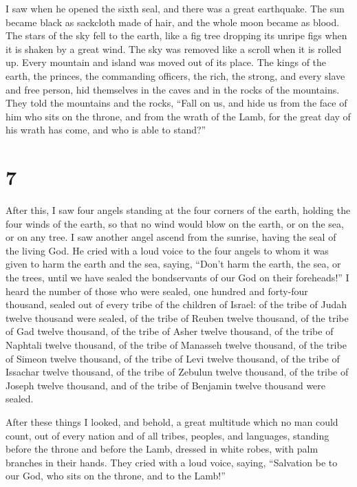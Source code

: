  I saw when he opened the sixth seal, and there was a great
earthquake. The sun became black as sackcloth made of hair, and the
whole moon became as blood.  The stars of the sky fell to
the earth, like a fig tree dropping its unripe figs when it is shaken by
a great wind.  The sky was removed like a scroll when it is
rolled up. Every mountain and island was moved out of its place.
 The kings of the earth, the princes, the commanding
officers, the rich, the strong, and every slave and free person, hid
themselves in the caves and in the rocks of the mountains. 
They told the mountains and the rocks, ``Fall on us, and hide us from
the face of him who sits on the throne, and from the wrath of the Lamb,
 for the great day of his wrath has come, and who is able
to stand?''

\hypertarget{section-6}{%
\section{7}\label{section-6}}

 After this, I saw four angels standing at the four corners
of the earth, holding the four winds of the earth, so that no wind would
blow on the earth, or on the sea, or on any tree.  I saw
another angel ascend from the sunrise, having the seal of the living
God. He cried with a loud voice to the four angels to whom it was given
to harm the earth and the sea,  saying, ``Don't harm the
earth, the sea, or the trees, until we have sealed the bondservants of
our God on their foreheads!''  I heard the number of those
who were sealed, one hundred and forty-four thousand, sealed out of
every tribe of the children of Israel:  of the tribe of
Judah twelve thousand were sealed, of the tribe of Reuben twelve
thousand, of the tribe of Gad twelve thousand,  of the tribe
of Asher twelve thousand, of the tribe of Naphtali twelve thousand, of
the tribe of Manasseh twelve thousand,  of the tribe of
Simeon twelve thousand, of the tribe of Levi twelve thousand, of the
tribe of Issachar twelve thousand,  of the tribe of Zebulun
twelve thousand, of the tribe of Joseph twelve thousand, and of the
tribe of Benjamin twelve thousand were sealed.

 After these things I looked, and behold, a great multitude
which no man could count, out of every nation and of all tribes,
peoples, and languages, standing before the throne and before the Lamb,
dressed in white robes, with palm branches in their hands. 
They cried with a loud voice, saying, ``Salvation be to our God, who
sits on the throne, and to the Lamb!''

